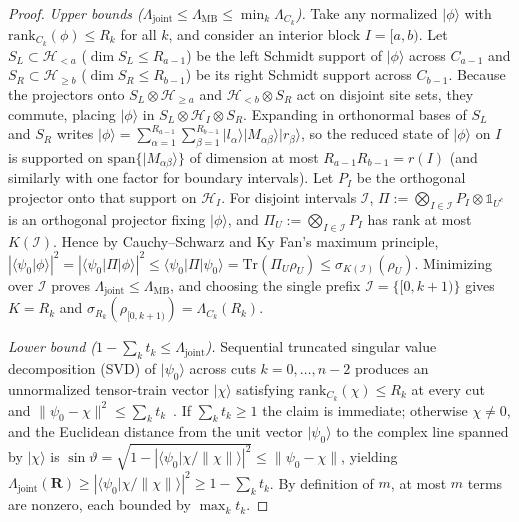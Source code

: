 \documentclass[reprint,aps,pra,floatfix,superscriptaddress,nofootinbib,longbibliography]{revtex4-2}
\theoremstyle{remark}
\theoremstyle{definition}
\newcommand{\calH}{\mathcal{H}}
\newcommand{\ket}[1]{\lvert #1 \rangle}
\newcommand{\bra}[1]{\langle #1 \rvert}
\newcommand{\braket}[2]{\langle #1 \vert #2 \rangle}
\newcommand{\rank}{\mathrm{rank}}
\newcommand{\Tr}{\mathrm{Tr}}
\begin{document}
\begin{proof}
\emph{Upper bounds ($\Lambda_{\mathrm{joint}}\le\Lambda_{\mathrm{MB}}\le\min_k\Lambda_{C_k}$).}
Take any normalized $\ket{\phi}$ with $\rank_{C_k}(\phi)\le R_k$ for all $k$, and
consider an interior block $I=[a,b)$. Let $S_L\subset\calH_{<a}$ ($\dim S_L\le R_{a-1}$)
be the left Schmidt support of $\ket{\phi}$ across $C_{a-1}$ and
$S_R\subset\calH_{\ge b}$ ($\dim S_R\le R_{b-1}$) be its right Schmidt support
across $C_{b-1}$. Because the projectors onto $S_L\otimes\calH_{\ge a}$ and
$\calH_{<b}\otimes S_R$ act on disjoint site sets, they commute, placing
$\ket{\phi}$ in $S_L\otimes\calH_I\otimes S_R$. Expanding in orthonormal bases of
$S_L$ and $S_R$ writes $\ket{\phi}=\sum_{\alpha=1}^{R_{a-1}}\sum_{\beta=1}^{R_{b-1}}\ket{l_\alpha}\ket{M_{\alpha\beta}}\ket{r_\beta}$,
so the reduced state of $\ket{\phi}$ on $I$ is supported on
$\mathrm{span}\{\ket{M_{\alpha\beta}}\}$ of dimension at most
$R_{a-1}R_{b-1}=r(I)$ (and similarly with one factor for boundary intervals).
Let $P_I$ be the orthogonal projector onto that support on $\calH_I$. For
disjoint intervals $\mathcal{I}$, $\Pi:=\bigotimes_{I\in\mathcal{I}}P_I\otimes\mathbb{1}_{U^c}$
is an orthogonal projector fixing $\ket{\phi}$, and $\Pi_U:=\bigotimes_{I\in\mathcal{I}}P_I$
has rank at most $K(\mathcal{I})$. Hence by Cauchy--Schwarz and Ky Fan's maximum
principle,
$|\braket{\psi_0}{\phi}|^2=|\bra{\psi_0}\Pi\ket{\phi}|^2\le\bra{\psi_0}\Pi\ket{\psi_0}=\Tr(\Pi_U\rho_U)\le\sigma_{K(\mathcal{I})}(\rho_U)$.
Minimizing over $\mathcal{I}$ proves $\Lambda_{\mathrm{joint}}\le\Lambda_{\mathrm{MB}}$,
and choosing the single prefix $\mathcal{I}=\{[0,k+1)\}$ gives $K=R_k$ and
$\sigma_{R_k}(\rho_{[0,k+1)})=\Lambda_{C_k}(R_k)$.

\emph{Lower bound ($1-\sum_k t_k\le\Lambda_{\mathrm{joint}}$).}
Sequential truncated singular value decomposition (SVD) of $\ket{\psi_0}$
across cuts $k=0,\dots,n-2$ produces
an unnormalized tensor-train vector $\ket{\chi}$ satisfying $\rank_{C_k}(\chi)\le R_k$
at every cut and $\|\psi_0-\chi\|^2\le\sum_k t_k$~\cite{oseledets2011tensor}. If
$\sum_k t_k\ge1$ the claim is immediate; otherwise $\chi\neq0$, and the Euclidean
distance from the unit vector $\ket{\psi_0}$ to the complex line spanned by
$\ket{\chi}$ is $\sin\vartheta=\sqrt{1-|\braket{\psi_0}{\chi/\|\chi\|}|^2}\le\|\psi_0-\chi\|$,
yielding $\Lambda_{\mathrm{joint}}(\mathbf{R})\ge|\braket{\psi_0}{\chi/\|\chi\|}|^2\ge1-\sum_k t_k$.
By definition of $m$, at most $m$ terms are nonzero, each bounded by
$\max_k t_k$.
\end{proof}
\end{document}
